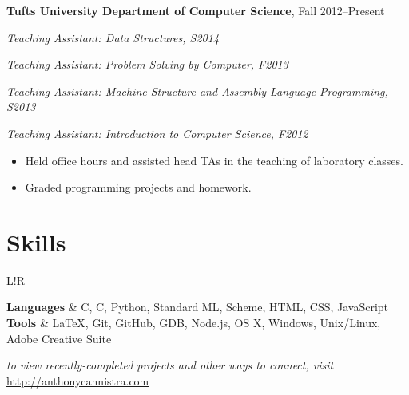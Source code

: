 \documentclass[10pt, letter]{article}
\newcommand\VRule{\color{lightgray}\vrule width 0.5pt}
\newcommand{\CC}{C\nolinebreak\hspace{-.05em}\raisebox{.4ex}{\tiny\bf +}\nolinebreak\hspace{-.10em}\raisebox{.4ex}{\tiny\bf +}}
\def\CC{{C\nolinebreak[4]\hspace{-.05em}\raisebox{.4ex}{\tiny\bf ++}}}
\newenvironment{list1}{
  \begin{list}{\ding{113}}{%
      \setlength{\itemsep}{0in}
      \setlength{\parsep}{0in} \setlength{\parskip}{0in}
      \setlength{\topsep}{0in} \setlength{\partopsep}{0in} 
      \setlength{\leftmargin}{0.17in}}}{\end{list}}
\begin{document}
\vspace{6pt}
{\bf Tufts University Department of Computer Science}, Fall 2012--Present\\
\vspace*{-.15in}
\begin{list1}
\item [] {\em Teaching Assistant: Data Structures, S2014}
\item [] {\em Teaching Assistant: Problem Solving by Computer, F2013}
\item [] {\em Teaching Assistant: Machine Structure and Assembly Language Programming, S2013}
\item [] {\em Teaching Assistant: Introduction to Computer Science, F2012}
\item [] {\begin{itemize}[topsep=0pt,itemsep=-1pt]
    \item Held office hours and assisted head TAs in the teaching of laboratory classes.
    \item Graded programming projects and homework.
\end{itemize}}
\vspace{6pt}

\end{list1}\vspace{6pt}


\vspace{-15pt}
\section*{Skills}
\begin{tabular}{L!{\VRule}R}

\textbf{Languages} & C, \CC, Python, Standard ML, Scheme, HTML, CSS, JavaScript \vspace{6pt}  \\
\textbf{Tools} \vspace{6pt} & \LaTeX, Git, GitHub, GDB, Node.js, OS X, Windows, Unix/Linux, Adobe Creative Suite \\
\end{tabular}
\null
\vfill
\emph{to view recently-completed projects and other ways to connect, visit} \url{http://anthonycannistra.com}
\end{document}
